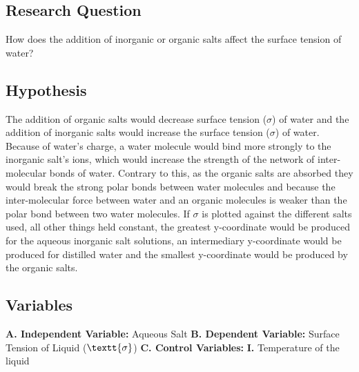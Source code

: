 \documentclass{article}
\begin{document}
\subsection{Research Question}

\par{How does the addition of inorganic or organic salts affect the surface tension of water?}

\subsection{Hypothesis}

\par{The addition of organic salts would decrease surface tension ($\sigma$) of water and the addition of inorganic salts would increase the surface tension ($\sigma$) of water. Because of water's charge, a water molecule would bind more strongly to the inorganic salt's ions, which would increase the strength of the network of inter-molecular bonds of water. Contrary to this, as the organic salts are absorbed they would break the strong polar bonds between water molecules and because the inter-molecular force between water and an organic molecules is weaker than the polar bond between two water molecules. If $\sigma$ is plotted against the different salts used, all other things held constant, the greatest y-coordinate would be produced for the aqueous inorganic salt solutions, an intermediary y-coordinate would be produced for distilled water and the smallest y-coordinate would be produced by the organic salts.}

\subsection{Variables}

\begin{spacing}{2}
    \par{\vspace{-0.5cm} \hspace{-1.4cm}
    \textbf{A. Independent Variable:} Aqueous Salt
    \newline
    \textbf{B. Dependent Variable:} Surface Tension of Liquid ($\textt{\sigma}$) 
    \newline
    \textbf{C. Control Variables:} \newline
   \hspace*{0.5cm} \textbf{I. }Temperature of the liquid \newline}
\end{spacing}
\end{document}
